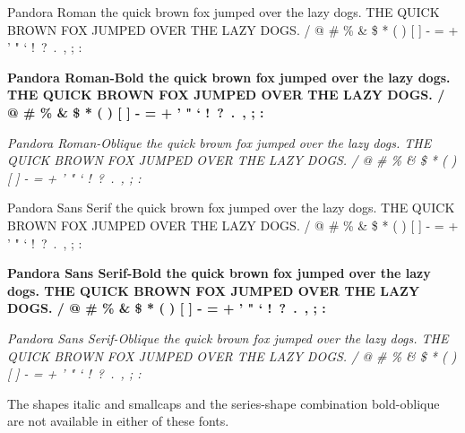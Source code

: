 \documentclass{article}
\begin{document}
\newpage
{\selectfont
Pandora Roman \newline
the quick brown fox jumped over the lazy dogs. \newline
THE QUICK BROWN FOX JUMPED OVER THE LAZY DOGS.  / @ \# \% \& \$ * ( ) [ ] - = + ' " ` !\ ?\ .\ , ; : \par
{\bfseries
Pandora Roman-Bold \newline
the quick brown fox jumped over the lazy dogs. \newline
THE QUICK BROWN FOX JUMPED OVER THE LAZY DOGS.  / @ \# \% \& \$ * ( ) [ ] - = + ' " ` !\ ?\ .\ , ; : }\par
{\slshape
Pandora Roman-Oblique \newline
the quick brown fox jumped over the lazy dogs. \newline
THE QUICK BROWN FOX JUMPED OVER THE LAZY DOGS.  / @ \# \% \& \$ * ( ) [ ] - = + ' " ` !\ ?\ .\ , ; : }}\par
{\selectfont
Pandora Sans Serif \newline
the quick brown fox jumped over the lazy dogs. \newline
THE QUICK BROWN FOX JUMPED OVER THE LAZY DOGS.  / @ \# \% \& \$ * ( ) [ ] - = + ' " ` !\ ?\ .\ , ; : \par
{\bfseries
Pandora Sans Serif-Bold \newline
the quick brown fox jumped over the lazy dogs. \newline
THE QUICK BROWN FOX JUMPED OVER THE LAZY DOGS.  / @ \# \% \& \$ * ( ) [ ] - = + ' " ` !\ ?\ .\ , ; : }\par
{\slshape
Pandora Sans Serif-Oblique \newline
the quick brown fox jumped over the lazy dogs. \newline
THE QUICK BROWN FOX JUMPED OVER THE LAZY DOGS.  / @ \# \% \& \$ * ( ) [ ] - = + ' " ` !\ ?\ .\ , ; : }}\par
\noindent
The shapes italic and smallcaps and the series-shape combination bold-oblique
are not available in either of these fonts. \par
\end{document}
